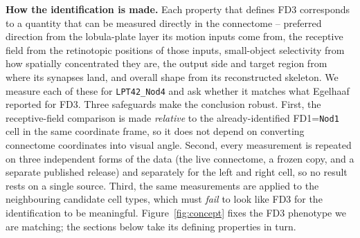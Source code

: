 \documentclass[11pt]{article}
\newcommand{\ttt}[1]{\texttt{#1}}
\begin{document}
\textbf{How the identification is made.}\quad
Each property that defines FD3 corresponds to a quantity that can be measured directly in the
connectome -- preferred direction from the lobula-plate layer its motion inputs come from, the
receptive field from the retinotopic positions of those inputs, small-object selectivity from how
spatially concentrated they are, the output side and target region from where its synapses land,
and overall shape from its reconstructed skeleton. We measure each of these for \ttt{LPT42\_Nod4}
and ask whether it matches what Egelhaaf reported for FD3. Three safeguards make the conclusion
robust. First, the receptive-field comparison is made \emph{relative} to the already-identified
FD1=\ttt{Nod1} cell in the same coordinate frame, so it does not depend on converting connectome
coordinates into visual angle. Second, every measurement is repeated on three independent forms of
the data (the live connectome, a frozen copy, and a separate published release) and separately for
the left and right cell, so no result rests on a single source. Third, the same measurements are
applied to the neighbouring candidate cell types, which must \emph{fail} to look like FD3 for the
identification to be meaningful. Figure~\ref{fig:concept} fixes the FD3 phenotype we are matching;
the sections below take its defining properties in turn.
\end{document}
